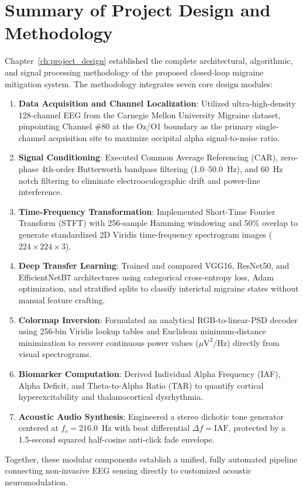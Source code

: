 \documentclass[12pt, a4paper]{report}
\begin{document}
\section{Summary of Project Design and Methodology}
\label{sec:methodology_summary}
Chapter~\ref{ch:project_design} established the complete architectural, algorithmic, and signal processing methodology of the proposed closed-loop migraine mitigation system. The methodology integrates seven core design modules:
\begin{enumerate}
    \item \textbf{Data Acquisition and Channel Localization}: Utilized ultra-high-density 128-channel EEG from the Carnegie Mellon University Migraine dataset, pinpointing Channel \#80 at the Oz/O1 boundary as the primary single-channel acquisition site to maximize occipital alpha signal-to-noise ratio.
    \item \textbf{Signal Conditioning}: Executed Common Average Referencing (CAR), zero-phase 4th-order Butterworth bandpass filtering (1.0--50.0~Hz), and 60~Hz notch filtering to eliminate electrooculographic drift and power-line interference.
    \item \textbf{Time-Frequency Transformation}: Implemented Short-Time Fourier Transform (STFT) with 256-sample Hamming windowing and 50\% overlap to generate standardized 2D Viridis time-frequency spectrogram images ($224 \times 224 \times 3$).
    \item \textbf{Deep Transfer Learning}: Trained and compared VGG16, ResNet50, and EfficientNetB7 architectures using categorical cross-entropy loss, Adam optimization, and stratified splits to classify interictal migraine states without manual feature crafting.
    \item \textbf{Colormap Inversion}: Formulated an analytical RGB-to-linear-PSD decoder using 256-bin Viridis lookup tables and Euclidean minimum-distance minimization to recover continuous power values ($\mu\text{V}^2/\text{Hz}$) directly from visual spectrograms.
    \item \textbf{Biomarker Computation}: Derived Individual Alpha Frequency (IAF), Alpha Deficit, and Theta-to-Alpha Ratio (TAR) to quantify cortical hyperexcitability and thalamocortical dysrhythmia.
    \item \textbf{Acoustic Audio Synthesis}: Engineered a stereo dichotic tone generator centered at $f_c = 216.0$~Hz with beat differential $\Delta f = \text{IAF}$, protected by a 1.5-second squared half-cosine anti-click fade envelope.
\end{enumerate}
Together, these modular components establish a unified, fully automated pipeline connecting non-invasive EEG sensing directly to customized acoustic neuromodulation.
\end{document}
